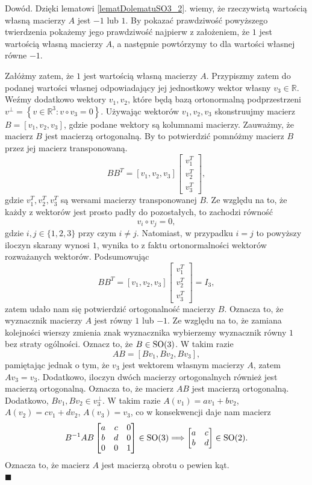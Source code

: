 \documentclass[a4paper,twoside,11pt,reqno]{mwrep}
\theoremstyle{plain} \newtheorem{twr}{Twierdzenie}
\theoremstyle{plain} \newtheorem{lem}{Lemat}
\theoremstyle{definition} \newtheorem{defi}{Definicja}
\theoremstyle{remark} \newtheorem*{wni}{Wniosek}
\theoremstyle{definition} \newtheorem{uwaga}{Uwaga}
\theoremstyle{definition}\newtheorem{prz}{Przykład}
\newenvironment{dowod}{\par\vspace{0.1cm}\par{\sc Dowód.}}{\hfill $\blacksquare$\par\vspace{0.4cm}\par}
\begin{document}
\begin{dowod}
Dzięki lematowi \ref{lematDolematuSO3_2}. wiemy, że rzeczywistą wartością 
własną macierzy $A$ jest $-1$ lub $1$. By pokazać prawdziwość powyższego twierdzenia
pokażemy jego prawdziwość najpierw z założeniem, że $1$ jest wartością własną macierzy $A$, a następnie
powtórzymy to dla wartości własnej równe $-1$.

Załóżmy zatem, że $1$ jest wartością własną macierzy $A$. Przypiszmy zatem do podanej wartości własnej
odpowiadający jej jednostkowy wektor własny $v_3\in \mathbb{R}$. Weźmy dodatkowo wektory $v_1,v_2$,
które będą bazą ortonormalną podprzestrzeni 
$v^\perp = \left\{ v\in\mathbb{R}^3 : v\circ v_3 = 0 \right\}$. Używając wektorów $v_1,v_2,v_3$ 
skonstruujmy macierz $B = [v_1,v_2,v_3]$, gdzie podane wektory są kolumnami macierzy. Zauważmy, że 
macierz $B$ jest macierzą ortogonalną. By to potwierdzić pomnóżmy macierz $B$ przez jej macierz transponowaną. 
$$
BB^T = [v_1,v_2,v_3]\left[\begin{array}{c}
v_1^T\\
v_2^T\\
v_3^T
\end{array}  \right],
$$
gdzie $v_1^T,v_2^T,v_3^T$ są wersami macierzy transponowanej $B$. Ze względu na to, że każdy z wektorów
jest prosto padły do pozostałych, to zachodzi równość 
$$v_i\circ v_j = 0,$$
gdzie $i,j\in \{1,2,3 \}$ przy czym $i\neq j $. Natomiast, w przypadku $i = j$ to powyższy iloczyn skarany
wynosi $1$, wynika to z faktu ortonormalności wektorów rozważanych wektorów. Podsumowując 
$$
BB^T = [v_1,v_2,v_3]\left[\begin{array}{c}
v_1^T\\
v_2^T\\
v_3^T
\end{array}  \right] = I_3,
$$
zatem udało nam się potwierdzić ortogonalność macierzy $B$. Oznacza to, że wyznacznik macierzy $A$
jest równy $1$ lub $-1$. Ze względu na to, że zamiana kolejności wierszy zmienia znak wyznacznika
wybierzemy wyznacznik równy $1$ bez straty ogólności.
Oznacz to, że $B\in\textup{SO}(3)$. W takim razie 
$$AB = [Bv_1,Bv_2,Bv_3],$$
pamiętając jednak o tym, że $v_3$ jest wektorem własnym macierzy $A$, zatem $Av_3 = v_3$.
Dodatkowo, iloczyn dwóch macierzy ortogonalnych również jest macierzą ortogonalną. Oznacza to, 
że macierz $AB$ jest macierzą ortogonalną. Dodatkowo, $Bv_1,Bv_2\in v_3^\perp$.
W takim razie $A(v_1)=av_1+bv_2$, $A(v_2)=cv_1+dv_2$, $A(v_3) = v_3$, co w konsekwencji daje nam macierz
$$B^{-1}AB\begin{bmatrix}
a&c   & 0\\
b&d & 0\\
0&0&1
\end{bmatrix}\in \textup{SO}(3) \Longrightarrow
\begin{bmatrix}
a&c\\
b&d 
\end{bmatrix}\in \textup{SO}(2).$$
Oznacza to, że macierz $A$ jest macierzą obrotu o pewien kąt.\\


\end{dowod}
\end{document}
